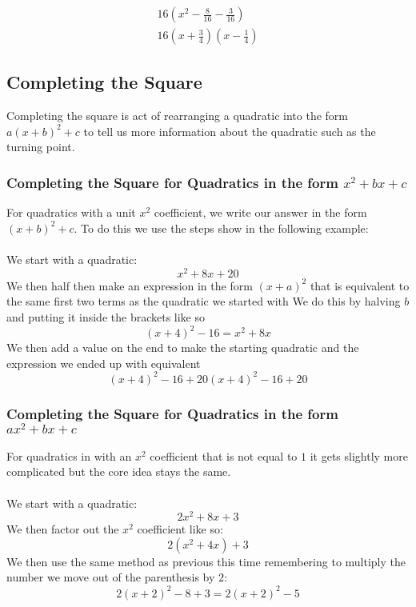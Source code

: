 \documentclass{article}
\begin{document}
\begin{gather*}
	16\left(x^2 - \frac{8}{16} - \frac{3}{16}\right)\\
	16\left(x + \frac{3}{4}\right)\left(x - \frac{1}{4}\right)
\end{gather*}
\subsection{Completing the Square}
Completing the square is act of rearranging a quadratic into the form $a(x + b)^2 +c$ to tell
us more information about the quadratic such as the turning point.

\subsubsection{Completing the Square for Quadratics in the form $x^2 + bx + c$}
For quadratics with a unit $x^2$ coefficient, we write our answer in the form \\
$(x+b)^2 + c$. To do this we use the steps show in the following example:
\\\\
We start with a quadratic:
\begin{equation}
	x^2 + 8x + 20
\end{equation}
We then half then make an expression in the form $(x+a)^2$ that
is equivalent to the same first two terms as the quadratic we started with
We do this by halving $b$ and putting it inside the brackets like so
\begin{equation}
	(x+4)^2 - 16= x^2 + 8x
\end{equation}
We then add a value on the end to make the starting quadratic
and the expression we ended up with equivalent
\begin{equation}
	(x + 4)^2 - 16 + 20 (x + 4)^2 - 16 + 20 
\end{equation}

\subsubsection{Completing the Square for Quadratics in the form $ax^2 + bx + c$}
For quadratics in with an $x^2$ coefficient that is not equal to $1$ it gets slightly more
complicated but the core idea stays the same.
\\\\
We start with a quadratic:
\begin{equation}
	2x^2 + 8x + 3
\end{equation}
We then factor out the $x^2$ coefficient like so:
\begin{equation}
	2(x^2 + 4x) + 3
\end{equation}
We then use the same method as previous this time remembering to multiply the number we move out of the parenthesis by $2$:
\begin{equation}	
	2(x + 2)^2 - 8 + 3 = 2(x + 2)^2 - 5
\end{equation}
\pagebreak
\end{document}
